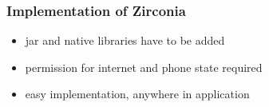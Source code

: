 \subsubsection{Implementation of Zirconia} \label{section:license-samsung-implementation}
\begin{itemize}
  \item jar and native libraries have to be added
  \item permission for internet and phone state required
  \item easy implementation, anywhere in application
\end{itemize}
